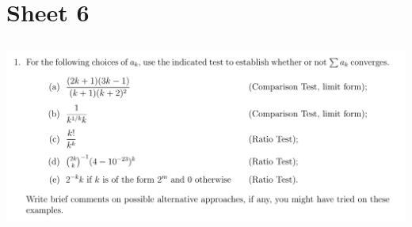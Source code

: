 \documentclass[12pt]{article}
\begin{document}
\newpage
\section{Sheet 6}

\subsection{}
\begin{mdframed}
\includegraphics[width=400pt]{img/analysis--oxford-M2-I-6-1.png}
\end{mdframed}
\end{document}

